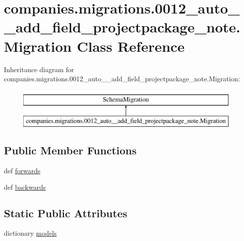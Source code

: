 \hypertarget{classcompanies_1_1migrations_1_10012__auto____add__field__projectpackage__note_1_1_migration}{\section{companies.\-migrations.0012\-\_\-auto\-\_\-\-\_\-add\-\_\-field\-\_\-projectpackage\-\_\-note.Migration Class Reference}
\label{classcompanies_1_1migrations_1_10012__auto____add__field__projectpackage__note_1_1_migration}
}
Inheritance diagram for companies.\-migrations.0012\-\_\-auto\-\_\-\-\_\-add\-\_\-field\-\_\-projectpackage\-\_\-note.Migration\-:\begin{figure}[H]
\begin{center}
\leavevmode
\includegraphics[height=2.000000cm]{classcompanies_1_1migrations_1_10012__auto____add__field__projectpackage__note_1_1_migration}
\end{center}
\end{figure}
\subsection*{Public Member Functions}
\begin{DoxyCompactItemize}
\item 
def \hyperlink{classcompanies_1_1migrations_1_10012__auto____add__field__projectpackage__note_1_1_migration_ae63cc4a20192fc2762edd04ce9baf30e}{forwards}
\item 
def \hyperlink{classcompanies_1_1migrations_1_10012__auto____add__field__projectpackage__note_1_1_migration_a86d07a89a7176e4a2354b538154e977d}{backwards}
\end{DoxyCompactItemize}
\subsection*{Static Public Attributes}
\begin{DoxyCompactItemize}
\item 
dictionary \hyperlink{classcompanies_1_1migrations_1_10012__auto____add__field__projectpackage__note_1_1_migration_a4c3c5cb5f9fcfb7ba2004fb24b7a0ec9}{models}
\end{DoxyCompactItemize}


